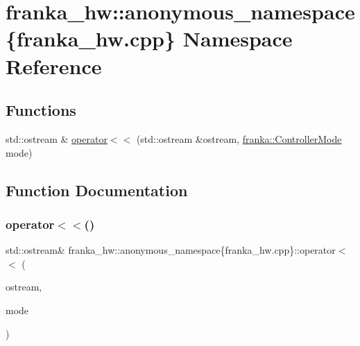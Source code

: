 \hypertarget{namespacefranka__hw_1_1anonymous__namespace_02franka__hw_8cpp_03}{}\section{franka\+\_\+hw\+:\+:anonymous\+\_\+namespace\{franka\+\_\+hw.\+cpp\} Namespace Reference}
\label{namespacefranka__hw_1_1anonymous__namespace_02franka__hw_8cpp_03}
\subsection*{Functions}
\begin{DoxyCompactItemize}
\item 
std\+::ostream \& \hyperlink{namespacefranka__hw_1_1anonymous__namespace_02franka__hw_8cpp_03_a1c2809f309a8443354ec3cf17bc169f2}{operator$<$$<$} (std\+::ostream \&ostream, \hyperlink{namespacefranka_a3e20bc77587e2c0c53598753e3f4816b}{franka\+::\+Controller\+Mode} mode)
\end{DoxyCompactItemize}


\subsection{Function Documentation}
\mbox{\label{namespacefranka__hw_1_1anonymous__namespace_02franka__hw_8cpp_03_a1c2809f309a8443354ec3cf17bc169f2}} 
\subsubsection{\texorpdfstring{operator$<$$<$()}{operator<<()}}
{\footnotesize\ttfamily std\+::ostream\& franka\+\_\+hw\+::anonymous\+\_\+namespace\{franka\+\_\+hw.\+cpp\}\+::operator$<$$<$ (\begin{DoxyParamCaption}\item[{std\+::ostream \&}]{ostream,  }\item[{\hyperlink{namespacefranka_a3e20bc77587e2c0c53598753e3f4816b}{franka\+::\+Controller\+Mode}}]{mode }\end{DoxyParamCaption})}



